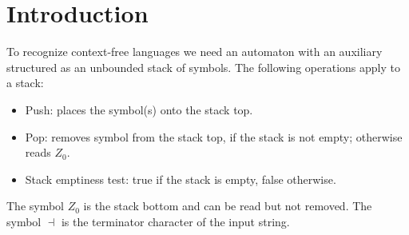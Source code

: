 \section{Introduction}

To recognize context-free languages we need an automaton with an auxiliary structured as an unbounded stack of symbols. 
The following operations apply to a stack:
\begin{itemize}
    \item Push: places the symbol(s) onto the stack top. 
    \item Pop: removes symbol from the stack top, if the stack is not empty; otherwise reads $Z_0$. 
    \item Stack emptiness test: true if the stack is empty, false otherwise. 
\end{itemize}
The symbol $Z_0$ is the stack bottom and can be read but not removed. 
The symbol $\dashv$ is the terminator character of the input string.

